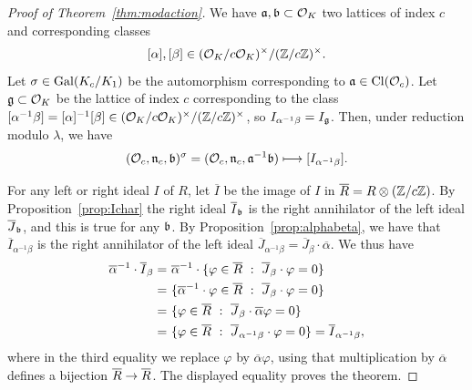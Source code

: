 \documentclass{article} \usepackage[active]{srcltx}
\newcommand{\n}{\mathfrak{n}}
\renewcommand{\O}{\mathcal{O}}
\begin{document}
\begin{proof}[Proof of Theorem~\ref{thm:modaction}]
We have $\fa, \fb \subset \O_K$ two lattices of index $c$
and corresponding classes 
$$
  [\alpha], [\beta] \in (\O_K/c\O_K)^{\times}/(\Z/c\Z)^{\times}.
$$
Let $\sigma\in\operatorname{Gal}(K_c/K_1)$ be the automorphism corresponding
to $\fa \in \Cl(\O_c)$. 
Let $\fg\subset \O_K$ be the lattice of index $c$ corresponding to the
class $[\alpha^{-1}\beta]= [\alpha]^{-1}[\beta] \in (\O_K/c\O_K)^{\times}/(\Z/c\Z)^{\times}$,
so $I_{\alpha^{-1}\beta} = I_{\mathfrak{g}}$.
Then, under reduction modulo $\lambda$, we have 
$$
  (\O_c, \n_c, \fb)^\sigma = (\O_c, \n_c, \fa^{-1} \fb) \longmapsto [I_{\alpha^{-1}\beta}].
$$

For any left or right ideal $I$  of $R$, let $\overline{I}$
be the image of $I$ in $\overline{R} = R\otimes(\mathbb{Z}/c\mathbb{Z})$.
By Proposition~\ref{prop:Ichar} the right
ideal $\overline{I}_{\mathfrak{b}}$ is the right annihilator of
the left ideal $\overline{J}_{\mathfrak{b}}$, and this is true for any $\mathfrak{b}$.
By Proposition~\ref{prop:alphabeta}, we have that
$
  \overline{I}_{\alpha^{-1}\beta}
$ is the right annihilator of the left ideal
$\overline{J}_{\alpha^{-1}\beta} = \overline{J}_{\beta} \cdot \overline{\alpha}$.
We thus have
\begin{align*}
\overline{\alpha}^{-1} \cdot \overline{I}_{\beta}
 =\,\, & 
\overline{\alpha}^{-1} \cdot \{\varphi \in \overline{R}\,\,:\,\,
    \overline{J}_{\beta} \cdot \varphi = 0\}\\
 =\,\,& 
\{\overline{\alpha}^{-1} \cdot \varphi \in \overline{R}\,\,:\,\,
    \overline{J}_{\beta}  \cdot \varphi = 0\}\\
=\,\,& 
\{\varphi \in \overline{R}\,\,:\,\,
    \overline{J}_{\beta} \cdot  \overline{\alpha} \varphi =0 \}\\
 =\,\,& 
\{\varphi \in \overline{R}\,\,:\,\,
    \overline{J}_{\alpha^{-1}\beta}  \cdot \varphi = 0\}
 = \overline{I}_{\alpha^{-1}\beta},
\end{align*}
where in the third equality we replace $\varphi$ by
$\overline{\alpha}\varphi$, using that multiplication
by $\overline{\alpha}$ defines a bijection $\overline{R}\to\overline{R}$.
The displayed equality proves the theorem.


\end{proof}
\end{document}
